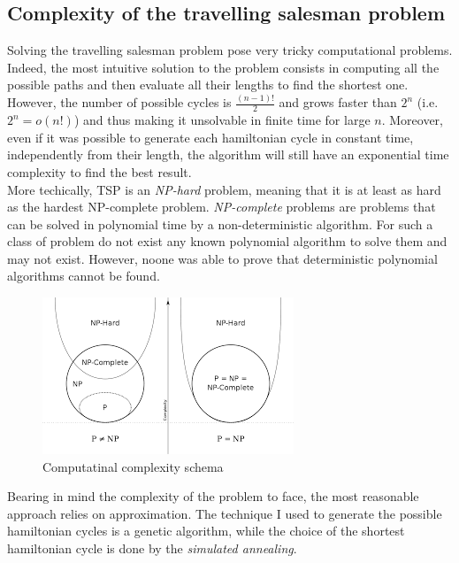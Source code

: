 \documentclass{article}
\begin{document}
\subsection{Complexity of the travelling salesman problem}
Solving the travelling salesman problem pose very tricky computational problems. Indeed, the most intuitive solution to the problem consists in computing all the possible paths and then evaluate all their lengths to find the shortest one. However, the number of possible cycles is $\frac{(n-1)!}{2}$ and grows faster than $2^n$ (i.e. $2^n = o(n!)$) and thus making it unsolvable in finite time for large $n$. Moreover, even if it was possible to generate each hamiltonian cycle in constant time, independently from their length, the algorithm will still have an exponential time complexity to find the best result.  \\
More techically, TSP is an \textit{NP-hard} problem, meaning that it is at least as hard as the hardest NP-complete problem. \textit{NP-complete} problems are problems that can be solved in polynomial time by a non-deterministic algorithm. For such a class of problem do not exist any known polynomial algorithm to solve them and may not exist. However, noone was able to prove that deterministic polynomial algorithms cannot be found.
\begin{figure}[H]
\includegraphics[scale=0.25]{complexity_classes.png} 
\centering
\caption{Computatinal complexity schema}
\end{figure}
\noindent Bearing in mind the complexity of the problem to face, the most reasonable approach relies on approximation. The technique I used to generate the possible hamiltonian cycles is a genetic algorithm, while the choice of the shortest hamiltonian cycle is done by the \textit{simulated annealing}.
\end{document}
